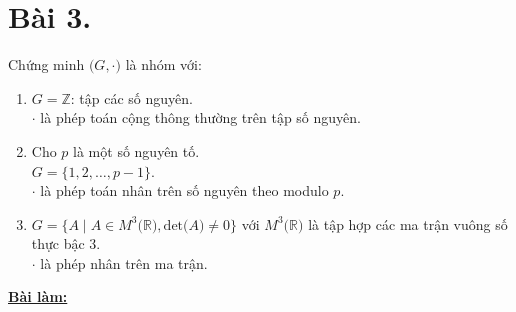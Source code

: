 \section*{Bài 3.}

Chứng minh $\big( G, \cdot \big)$ là nhóm với:
\begin{enumerate}[label=\alph*.]
    \item $G = \mathbb{Z}$: tập các số nguyên.\\
    $\cdot$ là phép toán cộng thông thường trên tập số nguyên.

    \item Cho $p$ là một số nguyên tố.\\
    $G = \big\{ 1, 2, \dotso, p - 1 \big\}$.\\
    $\cdot$ là phép toán nhân trên số nguyên theo modulo $p$.

    \item $G = \big\{ A \mid A \in M^3 \big( \mathbb{R} \big), \text{det} \big( A \big) \neq 0 \big\}$ với $M^3 \big( \mathbb{R} \big)$ là tập hợp các ma trận vuông số thực bậc 3.\\
    $\cdot$ là phép nhân trên ma trận.
\end{enumerate}
	

\centering
\textbf{\underline{Bài làm:}}

